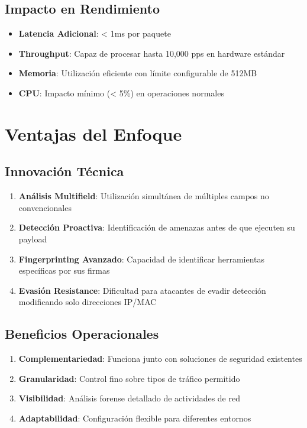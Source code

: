 \documentclass[12pt,a4paper]{article}
\begin{document}
\subsection{Impacto en Rendimiento}

\begin{itemize}
    \item \textbf{Latencia Adicional}: < 1ms por paquete
    \item \textbf{Throughput}: Capaz de procesar hasta 10,000 pps en hardware estándar
    \item \textbf{Memoria}: Utilización eficiente con límite configurable de 512MB
    \item \textbf{CPU}: Impacto mínimo (< 5\%) en operaciones normales
\end{itemize}

\section{Ventajas del Enfoque}

\subsection{Innovación Técnica}

\begin{enumerate}
    \item \textbf{Análisis Multifield}: Utilización simultánea de múltiples campos no convencionales
    \item \textbf{Detección Proactiva}: Identificación de amenazas antes de que ejecuten su payload
    \item \textbf{Fingerprinting Avanzado}: Capacidad de identificar herramientas específicas por sus firmas
    \item \textbf{Evasión Resistance}: Dificultad para atacantes de evadir detección modificando solo direcciones IP/MAC
\end{enumerate}

\subsection{Beneficios Operacionales}

\begin{enumerate}
    \item \textbf{Complementariedad}: Funciona junto con soluciones de seguridad existentes
    \item \textbf{Granularidad}: Control fino sobre tipos de tráfico permitido
    \item \textbf{Visibilidad}: Análisis forense detallado de actividades de red
    \item \textbf{Adaptabilidad}: Configuración flexible para diferentes entornos
\end{enumerate}
\end{document}
